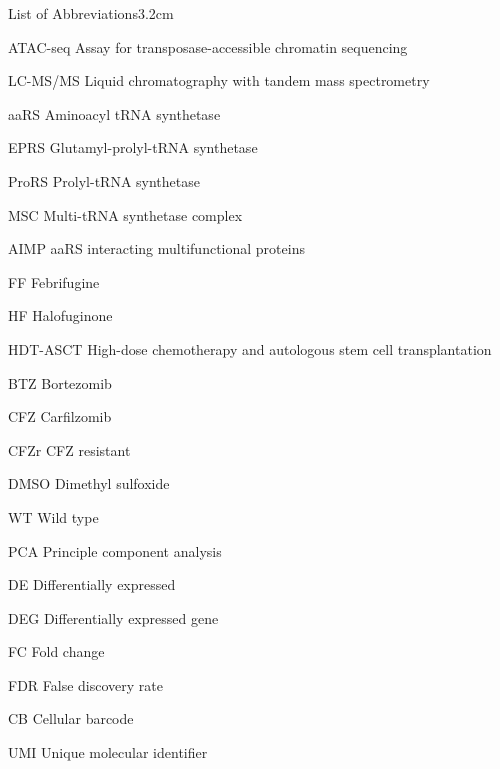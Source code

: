 \begin{mclistof}{List of Abbreviations}{3.2cm}
\item[ATAC-seq] Assay for transposase-accessible chromatin sequencing

\item[LC-MS/MS] Liquid chromatography with tandem mass spectrometry

\item[aaRS] Aminoacyl tRNA synthetase

\item[EPRS] Glutamyl-prolyl-tRNA synthetase

\item[ProRS] Prolyl-tRNA synthetase

\item[MSC] Multi-tRNA synthetase complex

\item[AIMP] aaRS interacting multifunctional proteins

\item[FF] Febrifugine

\item[HF] Halofuginone

\item[HDT-ASCT] High-dose chemotherapy and autologous stem cell transplantation

\item[BTZ] Bortezomib

\item[CFZ] Carfilzomib

\item[CFZr] CFZ resistant

\item[DMSO] Dimethyl sulfoxide

\item[WT] Wild type

\item[PCA] Principle component analysis

\item[DE] Differentially expressed

\item[DEG] Differentially expressed gene

\item[FC] Fold change

\item[FDR] False discovery rate

\item[CB] Cellular barcode

\item[UMI] Unique molecular identifier


\end{mclistof}

